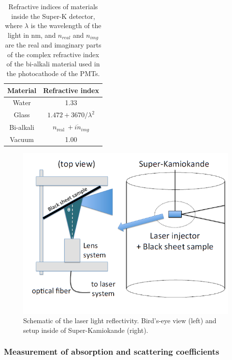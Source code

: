 \begin{table}
\centering
\begin{tabular}{||cc||}
    \hline Material & Refractive index \\
    \hline Water & 1.33 \\
    \hline Glass & $1.472+3670 / \lambda^2$ \\
    \hline Bi-alkali & $n_{\text {real }}+i \dot{n}_{i m g}$ \\
    \hline Vacuum & 1.00 \\
    \hline
    \end{tabular}
    \caption{Refractive indices of materials inside the Super-K detector, where $\lambda$ is the wavelength of the light in nm, and $n_{real}$ and $n_{img}$ are the real and imaginary parts of the complex refractive index of the bi-alkali material used in the photocathode of the PMTs.} 
    \label{table:refractiveindex}
\end{table}
    

\begin{figure}
    \includegraphics[width=\textwidth]{Figures/blacksheetrefsetup.png}
\caption{Schematic of the laser light reflectivity. Bird's-eye view (left) and setup inside of Super-Kamiokande (right).}
    \label{fig:blacksheetrefsetup}
\end{figure}


\subsubsection{Measurement of absorption and scattering coefficients}

